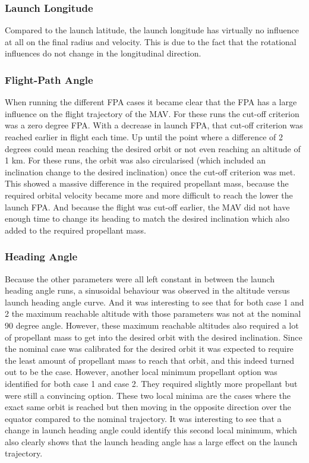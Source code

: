 \subsubsection{Launch Longitude}
Compared to the launch latitude, the launch longitude has virtually no influence at all on the final radius and velocity. This is due to the fact that the rotational influences do not change in the longitudinal direction. 

\subsubsection{Flight-Path Angle}
When running the different \ac{FPA} cases it became clear that the \ac{FPA} has a large influence on the flight trajectory of the \ac{MAV}. For these runs the cut-off criterion was a zero degree \ac{FPA}. With a decrease in launch \ac{FPA}, that cut-off criterion was reached earlier in flight each time. Up until the point where a difference of 2 degrees could mean reaching the desired orbit or not even reaching an altitude of 1 km. For these runs, the orbit was also circularised (which included an inclination change to the desired inclination) once the cut-off criterion was met. This showed a massive difference in the required propellant mass, because the required orbital velocity became more and more difficult to reach the lower the launch \ac{FPA}. And because the flight was cut-off earlier, the \ac{MAV} did not have enough time to change its heading to match the desired inclination which also added to the required propellant mass.

\subsubsection{Heading Angle}
Because the other parameters were all left constant in between the launch heading angle runs, a sinusoidal behaviour was observed in the altitude versus launch heading angle curve. And it was interesting to see that for both case 1 and 2 the maximum reachable altitude with those parameters was not at the nominal 90 degree angle. However, these maximum reachable altitudes also required a lot of propellant mass to get into the desired orbit with the desired inclination. Since the nominal case was calibrated for the desired orbit it was expected to require the least amount of propellant mass to reach that orbit, and this indeed turned out to be the case. However, another local minimum propellant option was identified for both case 1 and case 2. They required slightly more propellant but were still a convincing option. These two local minima are the cases where the exact same orbit is reached but then moving in the opposite direction over the equator compared to the nominal trajectory. It was interesting to see that a change in launch heading angle could identify this second local minimum, which also clearly shows that the launch heading angle has a large effect on the launch trajectory.


